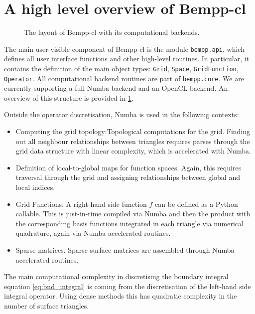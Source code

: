 \section{A high level overview of Bempp-cl}

\begin{figure}
	\centering
    
	\caption{The layout of Bempp-cl with its computational backends.}
	\label{fig:overview}
\end{figure}

The main user-visible component of Bempp-cl is the module \texttt{bempp.api}, which defines all user interface functions and other high-level routines. In particular, it contains the definition of the main object types: \texttt{Grid}, \texttt{Space}, \texttt{GridFunction}, \texttt{Operator}. All computational backend routines are part of \texttt{bempp.core}. We are currently supporting a full Numba backend and an OpenCL backend. An overview of this structure is provided in \cref{fig:overview}.

Outside the operator discretisation, Numba is used in the following contexts:
\begin{itemize}
	\item Computing the grid topology:Topological computations for the grid. Finding out all neighbour relationships between triangles requires parses through the grid data structure with linear complexity, which is accelerated with Numba.
	\item Definition of local-to-global maps for function spaces. Again, this requires traversal through the grid and assigning relationships between global and local indices.
	\item Grid Functions. A right-hand side function $f$ can be defined as a Python callable. This is just-in-time compiled via Numba and then the product with the corresponding basis functions integrated in each triangle via numerical quadrature, again via Numba accelerated routines.
	\item Sparse matrices. Sparse surface matrices are assembled through Numba accelerated routines.
\end{itemize}

The main computational complexity in discretising the boundary integral equation \cref{eq:bnd_integral} is coming from the discretisation of the left-hand side integral operator. Using dense methods this has quadratic complexity in the number of surface triangles.

